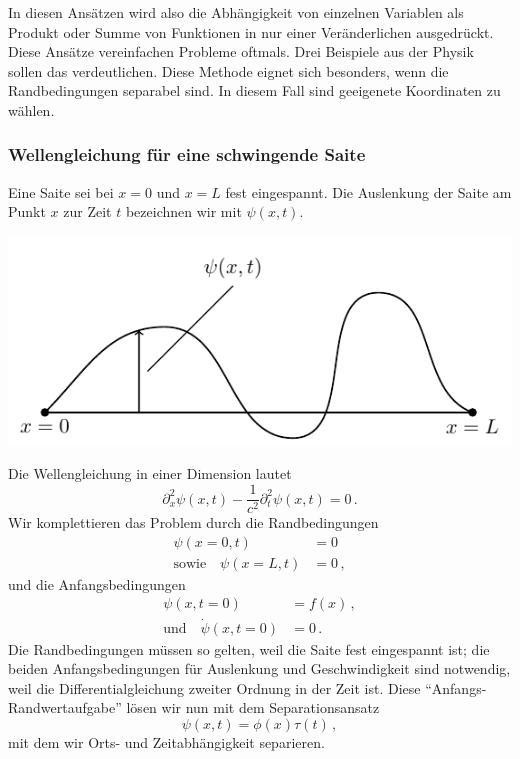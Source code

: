\documentclass[paper=a4, fontsize=11.0pt, abstractoff, DIV12]{scrartcl}
\begin{document}
In diesen Ansätzen wird also die Abhängigkeit von einzelnen Variablen als
Produkt oder Summe von Funktionen in nur einer Veränderlichen ausgedrückt.
Diese Ansätze vereinfachen Probleme oftmals. Drei Beispiele aus der Physik sollen das verdeutlichen. Diese Methode eignet sich besonders, wenn die
Randbedingungen separabel sind. In diesem Fall sind geeigenete Koordinaten zu
wählen.

\subsubsection{Wellengleichung für eine schwingende Saite}

Eine Saite sei bei $x=0$ und $x=L$ fest eingespannt. Die Auslenkung der
Saite am Punkt $x$ zur Zeit $t$ bezeichnen wir mit $\psi(x, t)$.

\begin{center}
    \includegraphics{Figures/Schwing}
\end{center}


Die Wellengleichung in einer Dimension lautet
\begin{equation}
\partial_x^2 \psi(x, t) - \frac{1}{c^2}\partial_t^2 \psi(x,t) = 0\,.
\end{equation}
Wir komplettieren das Problem durch die Randbedingungen
\begin{align}
\psi(x=0,t) &= 0\\
\text{sowie}\quad\psi(x=L,t) &= 0\,,
\end{align}
und die Anfangsbedingungen
\begin{align}
\psi(x,t=0) &= f(x)\, ,\label{eq:AB1}\\
\text{und}\quad\dot{\psi}(x,t=0) &= 0\,.
\end{align}
Die Randbedingungen müssen so gelten, weil die Saite fest eingespannt ist;
die beiden Anfangsbedingungen für Auslenkung und Geschwindigkeit sind
notwendig, weil die Differentialgleichung zweiter Ordnung in der Zeit ist.
Diese ``Anfangs-Randwertaufgabe'' lösen wir nun mit dem Separationsansatz
\begin{equation}
\psi(x,t) = \phi(x)\tau(t)\,,
\end{equation}
mit dem wir Orts- und Zeitabhängigkeit separieren.
\end{document}
